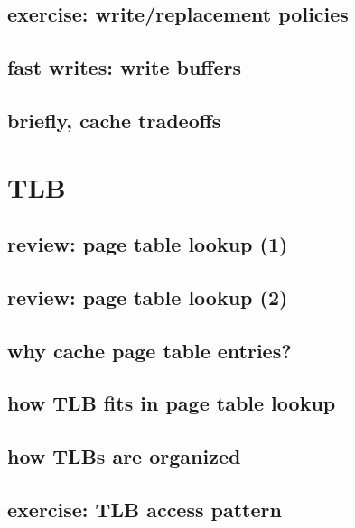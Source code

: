 \subsection{exercise: write/replacement policies}


\subsection{fast writes: write buffers}


\subsection{briefly, cache tradeoffs}


\section{TLB}

\subsection{review: page table lookup (1)}


\subsection{review: page table lookup (2)}

\subsection{why cache page table entries?}


\subsection{how TLB fits in page table lookup}


\subsection{how TLBs are organized}

\subsection{exercise: TLB access pattern}



